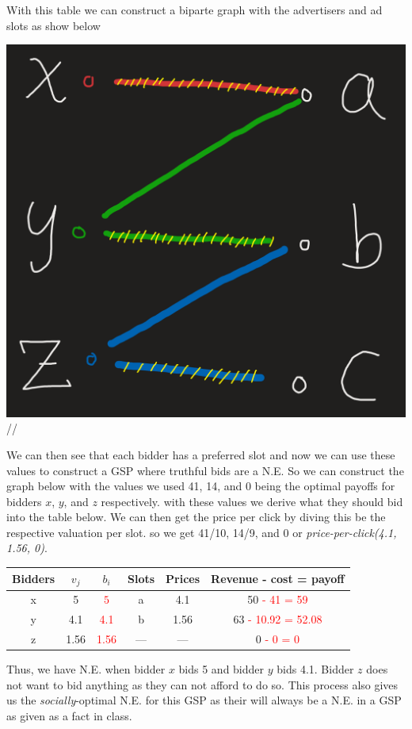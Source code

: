 \documentclass[11pt]{article}
\begin{document}
{\begin{enumerate}
\begin{center}
	\end{center}
	With this table we can construct a biparte graph with the advertisers and ad slots as show below
	\begin{center}
	\includegraphics[scale=0.5]{Figure1.1}//
	\end{center}
	We can then see that each bidder has a preferred slot and now we can use these values to construct a GSP where truthful bids are a N.E.	So we can construct the graph below with the values we used 41, 14, and 0 being the optimal payoffs for bidders $x$, $y$, and $z$ respectively.  with these values we derive what they should bid into the table below.  We can then get the price per click by diving this be the respective valuation per slot.  so we get 41/10, 14/9, and 0 or \textit{price-per-click(4.1, 1.56, 0)}.
	\begin{center}
		\begin{tabular}{ |c|c|c|c|c|c| } 
			\hline
			Bidders & 	$v_j$ 	& 	$b_i$ 					& 	Slots 	& 	Prices 	&  Revenue - cost = payoff \\
			\hline \hline
			x 	  & 	5 	& 	 \textcolor{red}{$5$} 		& 	a	& 	4.1 	&  50 \textcolor{red}{ - 41 = 59}\\
			\hline
			y 	  & 	4.1 	& 	 \textcolor{red}{4.1} 		& 	b 	& 	1.56	& 63  \textcolor{red}{ - 10.92 = 52.08} \\
			\hline
			z 	  & 	1.56 	& 	 \textcolor{red}{1.56} 		& 	---	& 	--- 	&  0 \textcolor{red}{ - 0 = 0} \\
			\hline
		\end{tabular}
	\end{center}
	Thus, we have N.E. when bidder $x$ bids 5 and bidder $y$ bids 4.1.  Bidder $z$ does not want to bid anything as they can not afford to do so.  This process also gives us the \textit{socially}-optimal N.E. for this GSP as their will always be a N.E. in a GSP as given as a fact in class.
\end{enumerate}
}
\end{document}
